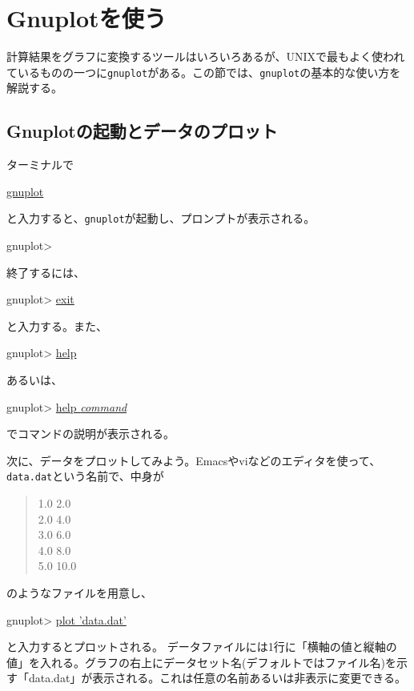 {%

\section{Gnuplotを使う}
\label{sec:unix:gnuplot}

計算結果をグラフに変換するツールはいろいろあるが、UNIXで最もよく使われているものの一つに{\tt gnuplot}がある。この節では、{\tt gnuplot}の基本的な使い方を解説する。

\subsection{Gnuplotの起動とデータのプロット}

ターミナルで
\begin{commandline2}
\prompt \underline{gnuplot}
\end{commandline2} \noindent
と入力すると、{\tt gnuplot}が起動し、プロンプトが表示される。
\begin{commandline2}
gnuplot>
\end{commandline2} \noindent
終了するには、
\begin{commandline2}
gnuplot> \underline{exit}
\end{commandline2} \noindent
と入力する。また、
\begin{commandline2}
gnuplot> \underline{help}
\end{commandline2} \noindent
あるいは、
\begin{commandline2}
gnuplot> \underline{help {\it command}}
\end{commandline2} \noindent
でコマンドの説明が表示される。

次に、データをプロットしてみよう。Emacsやviなどのエディタを使って、{\tt data.dat}という名前で、中身が
\begin{quote}
 1.0 2.0 \\
 2.0 4.0 \\
 3.0 6.0 \\
 4.0 8.0 \\
 5.0 10.0
\end{quote}
のようなファイルを用意し、
\begin{commandline2}
gnuplot> \underline{plot 'data.dat'}
\end{commandline2} \noindent
と入力するとプロットされる。 データファイルには1行に「横軸の値と縦軸の値」を入れる。グラフの右上にデータセット名(デフォルトではファイル名)を示す「data.dat」が表示される。これは任意の名前あるいは非表示に変更できる。

}
